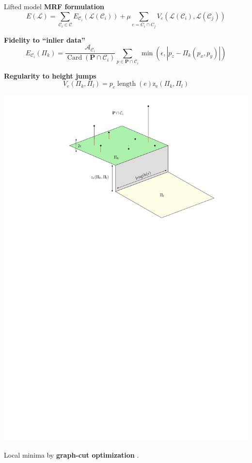 \begin{frame}{Lifted model}
	\scriptsize
	\textbf{MRF formulation}
	\[
		E(\mathcal{L}) = \sum_{\mathcal{C}_i \in \mathcal{C}} E_{\mathcal{C}_i}(\mathcal{L}(\mathcal{C}_i)) + \mu \sum_{e = C_i \cap C_j} V_e(\mathcal{L}(\mathcal{C}_i), \mathcal{L}(\mathcal{C}_j))
	\]
	
	\begin{minipage}{0.6\linewidth}
		\textbf{Fidelity to ``inlier data''}
		\[
			E_{\mathcal{C}_i}(\Pi_k) = \frac{ \mathcal{A}_{\mathcal{C}_i}}{\operatorname{Card}(\mathbf{P}\cap \mathcal{C}_i)} \sum_{p \in \mathbf{P} \cap \mathcal{C}_i} \min(\epsilon, | p_z - \Pi_k(p_x, p_y) |)
		\]
		
		\textbf{Regularity to height jumps}
		\[ V_{e}(\Pi_k, \Pi_l) = p_e \operatorname{length}(e) \operatorname{z_e}(\Pi_k, \Pi_l) \]
	\end{minipage}%
	\begin{minipage}{0.4\linewidth}
		\centering
		\includegraphics[width=\linewidth]{lift_terms}
	\end{minipage}
	\vspace{0.5cm}
	
	Local minima by \textbf{graph-cut optimization} \cite{boykov_FastApproximateEnergy_2001}.
\end{frame}


